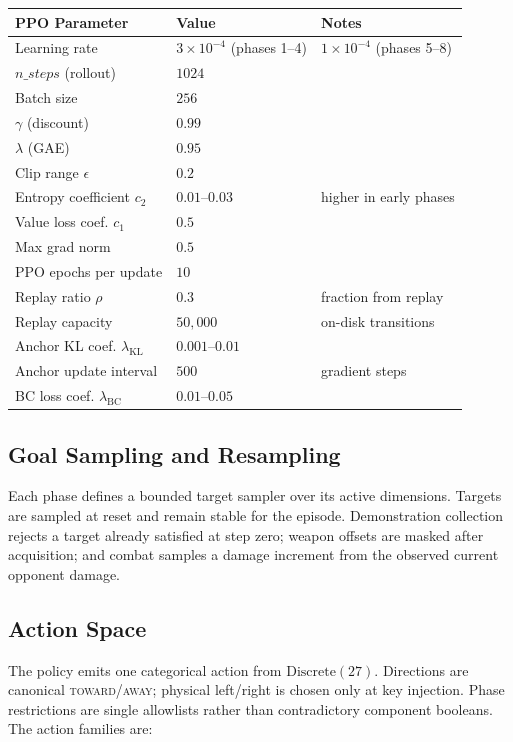 \documentclass[11pt,a4paper]{article}
\begin{document}
\begin{table}[h]
\centering
\small
\begin{tabular}{@{}lll@{}}
\toprule
\textbf{PPO Parameter} & \textbf{Value} & \textbf{Notes} \\
\midrule
Learning rate & $3 \times 10^{-4}$ (phases 1--4) & $1 \times 10^{-4}$ (phases 5--8) \\
$n\_steps$ (rollout) & $1024$ & \\
Batch size & $256$ & \\
$\gamma$ (discount) & $0.99$ & \\
$\lambda$ (GAE) & $0.95$ & \\
Clip range $\epsilon$ & $0.2$ & \\
Entropy coefficient $c_2$ & $0.01$--$0.03$ & higher in early phases \\
Value loss coef. $c_1$ & $0.5$ & \\
Max grad norm & $0.5$ & \\
PPO epochs per update & $10$ & \\
\midrule
Replay ratio $\rho$ & $0.3$ & fraction from replay \\
Replay capacity & $50{,}000$ & on-disk transitions \\
Anchor KL coef. $\lambda_{\text{KL}}$ & $0.001$--$0.01$ & \\
Anchor update interval & $500$ & gradient steps \\
BC loss coef. $\lambda_{\text{BC}}$ & $0.01$--$0.05$ & \\
\bottomrule
\end{tabular}
\end{table}

\subsection{Goal Sampling and Resampling}

Each phase defines a bounded target sampler over its active dimensions. Targets are
sampled at reset and remain stable for the episode. Demonstration collection rejects a
target already satisfied at step zero; weapon offsets are masked after acquisition; and
combat samples a damage increment from the observed current opponent damage.

\subsection{Action Space}

The policy emits one categorical action from $\text{Discrete}(27)$. Directions are
canonical \textsc{toward}/\textsc{away}; physical left/right is chosen only at key
injection. Phase restrictions are single allowlists rather than contradictory component
booleans. The action families are:
\end{document}
